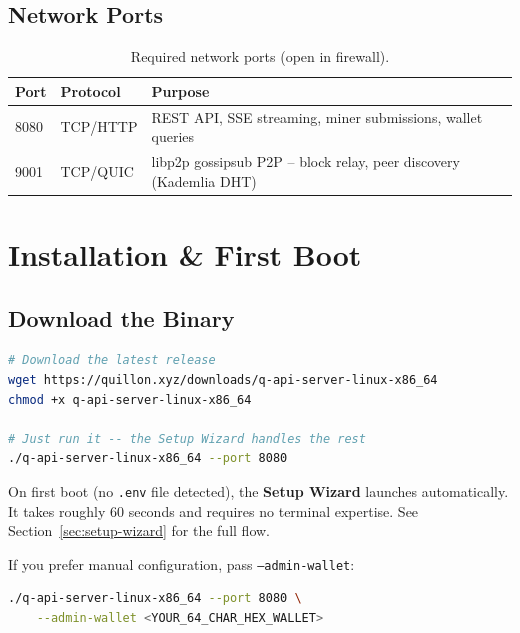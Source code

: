 \documentclass[11pt,a4paper]{article}
\begin{document}
\subsection{Network Ports}

\begin{table}[H]
\centering
\begin{tabular}{@{}llp{7cm}@{}}
\toprule
\textbf{Port} & \textbf{Protocol} & \textbf{Purpose} \\
\midrule
8080 & TCP/HTTP  & REST API, SSE streaming, miner submissions, wallet queries \\
9001 & TCP/QUIC  & libp2p gossipsub P2P -- block relay, peer discovery (Kademlia DHT) \\
\bottomrule
\end{tabular}
\caption{Required network ports (open in firewall).}
\end{table}

\section{Installation \& First Boot}

\subsection{Download the Binary}

\begin{lstlisting}[language=bash,title={Download and start (one command)}]
# Download the latest release
wget https://quillon.xyz/downloads/q-api-server-linux-x86_64
chmod +x q-api-server-linux-x86_64

# Just run it -- the Setup Wizard handles the rest
./q-api-server-linux-x86_64 --port 8080
\end{lstlisting}

On first boot (no \texttt{.env} file detected), the \textbf{Setup Wizard} launches
automatically. It takes roughly 60 seconds and requires no terminal expertise.
See Section~\ref{sec:setup-wizard} for the full flow.

If you prefer manual configuration, pass \texttt{--admin-wallet}:

\begin{lstlisting}[language=bash,title={Manual start (skips wizard)}]
./q-api-server-linux-x86_64 --port 8080 \
    --admin-wallet <YOUR_64_CHAR_HEX_WALLET>
\end{lstlisting}
\end{document}
